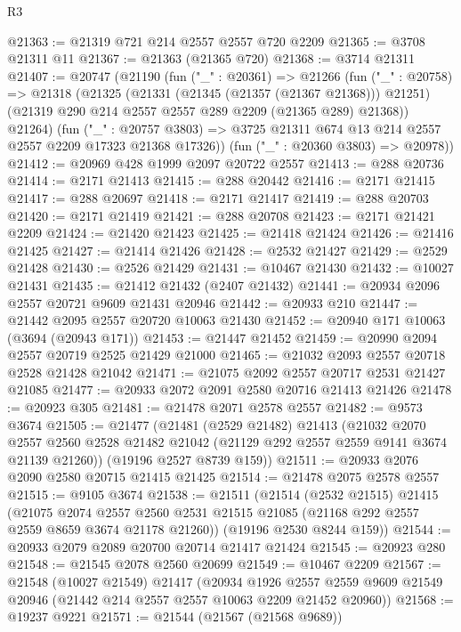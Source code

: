 \begin{lexlean}{R3}
\begin{coremodule}
@21363 := @21319 @721 @214 @2557 @2557 @720 @2209
@21365 := @3708 @21311 @11
@21367 := @21363 (@21365 @720)
@21368 := @3714 @21311
@21407 := @20747
    (@21190
      (fun ("_" : @20361) =>
      @21266
        (fun ("_" : @20758) =>
        @21318
          (@21325
            (@21331 (@21345 (@21357 (@21367 @21368))) @21251)
            (@21319 @290 @214 @2557 @2557 @289 @2209 (@21365 @289) @21368))
          @21264)
        (fun ("_" : @20757 @3803) =>
        @3725 @21311 @674 @13 @214 @2557 @2557 @2209 @17323 @21368 @17326))
      (fun ("_" : @20360 @3803) => @20978))
@21412 := @20969 @428 @1999 @2097 @20722 @2557
@21413 := @288 @20736
@21414 := @2171 @21413
@21415 := @288 @20442
@21416 := @2171 @21415
@21417 := @288 @20697
@21418 := @2171 @21417
@21419 := @288 @20703
@21420 := @2171 @21419
@21421 := @288 @20708
@21423 := @2171 @21421 @2209
@21424 := @21420 @21423
@21425 := @21418 @21424
@21426 := @21416 @21425
@21427 := @21414 @21426
@21428 := @2532 @21427
@21429 := @2529 @21428
@21430 := @2526 @21429
@21431 := @10467 @21430
@21432 := @10027 @21431
@21435 := @21412 @21432 (@2407 @21432)
@21441 := @20934 @2096 @2557 @20721 @9609 @21431 @20946
@21442 := @20933 @210
@21447 := @21442 @2095 @2557 @20720 @10063 @21430
@21452 := @20940 @171 @10063 (@3694 (@20943 @171))
@21453 := @21447 @21452
@21459 := @20990 @2094 @2557 @20719 @2525 @21429 @21000
@21465 := @21032 @2093 @2557 @20718 @2528 @21428 @21042
@21471 := @21075 @2092 @2557 @20717 @2531 @21427 @21085
@21477 := @20933 @2072 @2091 @2580 @20716 @21413 @21426
@21478 := @20923 @305
@21481 := @21478 @2071 @2578 @2557
@21482 := @9573 @3674
@21505 := @21477
    (@21481
      (@2529 @21482)
      @21413
      (@21032
        @2070
        @2557
        @2560
        @2528
        @21482
        @21042
        (@21129 @292 @2557 @2559 @9141 @3674 @21139 @21260))
      (@19196 @2527 @8739 @159))
@21511 := @20933 @2076 @2090 @2580 @20715 @21415 @21425
@21514 := @21478 @2075 @2578 @2557
@21515 := @9105 @3674
@21538 := @21511
    (@21514
      (@2532 @21515)
      @21415
      (@21075
        @2074
        @2557
        @2560
        @2531
        @21515
        @21085
        (@21168 @292 @2557 @2559 @8659 @3674 @21178 @21260))
      (@19196 @2530 @8244 @159))
@21544 := @20933 @2079 @2089 @20700 @20714 @21417 @21424
@21545 := @20923 @280
@21548 := @21545 @2078 @2560 @20699
@21549 := @10467 @2209
@21567 := @21548
    (@10027 @21549)
    @21417
    (@20934
      @1926
      @2557
      @2559
      @9609
      @21549
      @20946
      (@21442 @214 @2557 @2557 @10063 @2209 @21452 @20960))
@21568 := @19237 @9221
@21571 := @21544 (@21567 (@21568 @9689))

\end{coremodule}
\end{lexlean}
